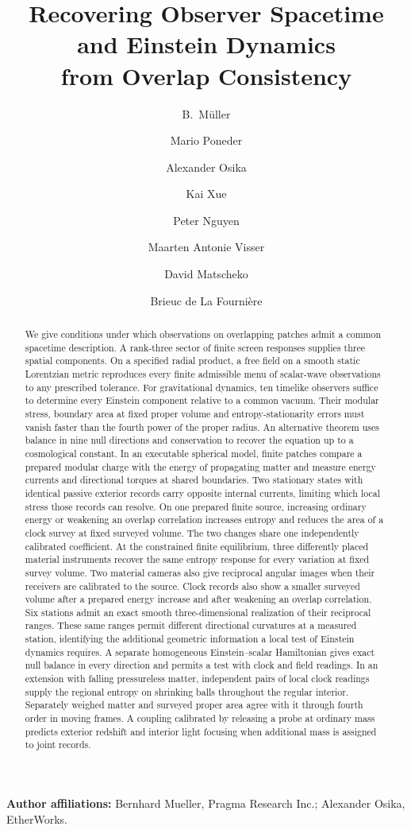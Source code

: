 \documentclass[11pt]{article}
\title{Recovering Observer Spacetime and Einstein Dynamics\\
from Overlap Consistency}
\author{B.\ M\"uller \and Mario Poneder \and Alexander Osika \and Kai Xue
\and Peter Nguyen \and Maarten Antonie Visser \and David Matscheko
\and Brieuc de La Fourni\`ere}
\date{\OPHPaperReleaseDate}
\begin{document}
\maketitle
\OPHPaperReleaseBanner

\begin{center}
\small\textbf{Author affiliations:} Bernhard Mueller, Pragma Research Inc.; Alexander Osika, EtherWorks.
\end{center}

\begin{abstract}
We give conditions under which observations on overlapping patches admit
a common spacetime description. A rank-three sector of finite screen
responses supplies three spatial components. On a specified radial product,
a free field on a smooth static Lorentzian metric reproduces every finite
admissible menu of scalar-wave observations to any prescribed tolerance.
For gravitational dynamics, ten timelike observers suffice to determine
every Einstein component relative to a common vacuum. Their modular
stress, boundary area at fixed proper volume and entropy-stationarity
errors must vanish faster than the fourth power of the proper radius.
An alternative theorem uses balance in nine null directions and
conservation to recover the equation up to a cosmological constant.
In an executable spherical model, finite patches compare a prepared
modular charge with the energy of propagating matter and measure energy
currents and directional torques at shared boundaries. Two stationary
states with identical passive exterior records carry opposite internal
currents, limiting which local stress those records can resolve.
On one prepared finite source, increasing ordinary energy or weakening
an overlap correlation increases entropy and reduces the area of a
clock survey at fixed surveyed volume. The two changes share one
independently calibrated coefficient. At the constrained finite equilibrium,
three differently placed material instruments recover the same entropy
response for every variation at fixed survey volume. Two material cameras
also give reciprocal angular images when their receivers are calibrated to
the source. Clock records also show a smaller surveyed volume after a prepared energy increase and after weakening an overlap correlation. Six stations admit an
exact smooth three-dimensional realization of their reciprocal ranges.
These same ranges permit different directional curvatures at a measured
station, identifying the additional geometric information a local test
of Einstein dynamics requires.
A separate homogeneous Einstein--scalar Hamiltonian gives exact null
balance in every direction and permits a test with clock and field readings.
In an extension with falling pressureless matter, independent pairs
of local clock readings supply the regional entropy on shrinking balls
throughout the regular interior. Separately weighed matter and surveyed
proper area agree with it through fourth order in moving frames. A coupling
calibrated by releasing a probe at ordinary mass predicts exterior redshift
and interior light focusing when additional mass is assigned to joint records.
\end{abstract}
\end{document}
